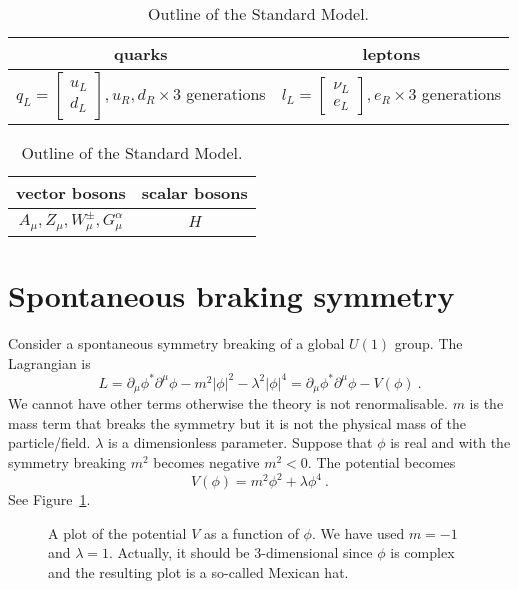    \begin{table}[h!]
        \centering
        \begin{tabular}{c | c }
            quarks & leptons \\
            \hline
            $q_L = \begin{bmatrix} u_L \\ d_L \end{bmatrix}, u_R, d_R \times 3$ generations&  $l_L = \begin{bmatrix} \nu_L \\ e_L \end{bmatrix}, e_R \times 3$ generations \\ 
        \end{tabular}
        \begin{tabular}{c | c }
            vector bosons & scalar bosons\\
            \hline
            $A_\mu, Z_\mu, W^\pm_\mu, G_\mu^\alpha$ & $H$  \\
        \end{tabular}
        \caption{Outline of the Standard Model.}
        \label{tab:std}
    \end{table}

\section{Spontaneous braking symmetry}

    Consider a spontaneous symmetry breaking of a global $U(1)$ group. The Lagrangian is 
    \begin{equation*}
        L = \partial_\mu \phi^* \partial^\mu \phi - m^2 |\phi|^2 - \lambda^2 |\phi|^4 = \partial_\mu \phi^* \partial^\mu \phi - V(\phi) ~.
    \end{equation*}
    We cannot have other terms otherwise the theory is not renormalisable. $m$ is the mass term that breaks the symmetry but it is not the physical mass of the particle/field. $\lambda$ is a dimensionless parameter. Suppose that $\phi$ is real and with the symmetry breaking $m^2$ becomes negative $m^2 < 0$. The potential becomes 
    \begin{equation*}
        V(\phi) = m^2 \phi^2 + \lambda \phi^4 ~.
    \end{equation*}
    See Figure~\ref{fig:bos}.

    \begin{figure}
        \centering
        \caption{A plot of the potential $V$ as a function of $\phi$. We have used $m = -1$ and $\lambda = 1$. Actually, it should be $3$-dimensional since $\phi$ is complex and the resulting plot is a so-called Mexican hat.}
        \label{fig:bos}
    \end{figure}

